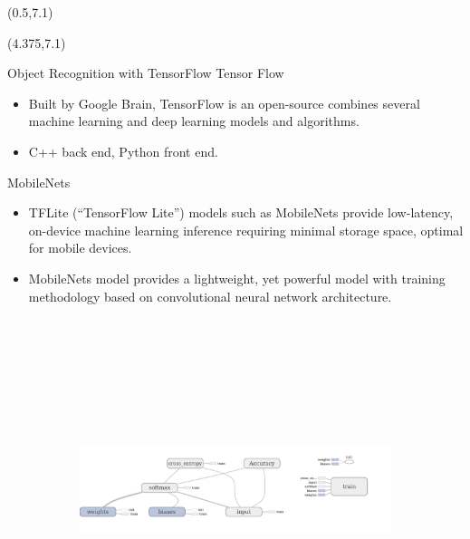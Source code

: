\documentclass[22pt]{beamer}
\begin{document}
\begin{frame}[fragile]
\begin{textblock}{3.5}
\end{textblock}

\begin{textblock}{7.25}(0.5,7.1)



\end{textblock}



\begin{textblock}{7.25}(4.375,7.1)
\begin{block}{Object Recognition with TensorFlow}
Tensor Flow
\begin{itemize}
\item Built by Google Brain, TensorFlow is an open-source combines several machine learning and deep learning models and algorithms.
\item C++ back end, Python front end.
\end{itemize}
MobileNets
\begin{itemize}
\item TFLite (“TensorFlow Lite”) models such as MobileNets provide low-latency, on-device machine learning inference requiring minimal storage space, optimal for mobile devices. 
\item MobileNets model provides a lightweight, yet powerful model with training methodology based on convolutional neural network architecture.
\end{itemize}
\begin{figure}[htbp] %
\begin{subfigure}{0.95\textwidth}
   \centering
   \includegraphics[height=10cm]{softmax.png}

\end{subfigure}
\end{figure}
\end{block}
\end{textblock}
\end{frame}
\end{document}
